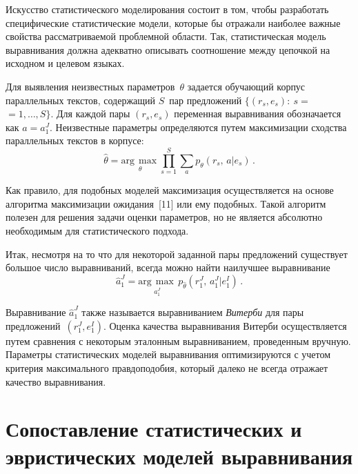 \begin{multicols}{2}
      Искусство статистического моделирования состоит в том, чтобы 
разработать специфические статистические модели, которые бы отражали 
наиболее важные свойства рассматриваемой проблемной области. Так, 
статистическая модель выравнивания должна адекватно описывать 
соотношение между цепочкой на исходном и целевом языках.
      
      Для выявления неизвестных параметров~$\theta$  задается 
обучающий корпус параллельных текстов, содержащий $S$~пар 
предложений $\{(r_s,e_s):\ s=$\linebreak $=1,\ldots , S\}$. Для каждой пары $(r_s, e_s)$ 
переменная выравнивания обозначается как $a=a_1^J$. Неизвестные 
параметры определяются путем максимизации сходства параллельных 
текстов в корпусе:
      \begin{equation*}
      \hat{\theta} =\underset{\theta}{\mathrm{arg}\,\max}\prod\limits_{s=1}^S 
\sum\limits_{a} p_\theta\left(r_s,\,a\vert e_s\right)\,.
      \end{equation*}
      
      Как правило, для подобных моделей максимизация осуществляется на 
основе алгоритма максимизации ожидания~[11] или ему подобных. Такой 
алгоритм полезен для решения задачи оценки параметров, но не является 
абсолютно необходимым для статистического подхода.
      
      Итак, несмотря на то что для некоторой заданной пары предложений 
существует большое число выравниваний, всегда можно найти наилучшее 
выравнивание
      \begin{equation*}
      \hat{a}_1^J 
=\underset{a_1^J}{\mathrm{arg}\,\max}\,p_{\hat{\theta}}\left( r_1^J,\,a_1^J\vert 
e_1^I\right)\,.
      \end{equation*}
      
      Выравнивание $\hat{a}_1^J$ также называется выравниванием 
\textit{Витерби} для пары предложений~$(r_1^J,e_1^I)$. Оценка качества 
выравнивания Витерби осуществляется путем сравнения с некоторым 
эталонным выравниванием, проведенным вручную. Параметры 
статистических моделей выравнивания оптимизируются с учетом критерия 
максимального правдоподобия, который далеко не всегда отражает качество 
выравнивания.
      
\section{Сопоставление статистических и эвристических моделей 
выравнивания}
      

\end{multicols}

